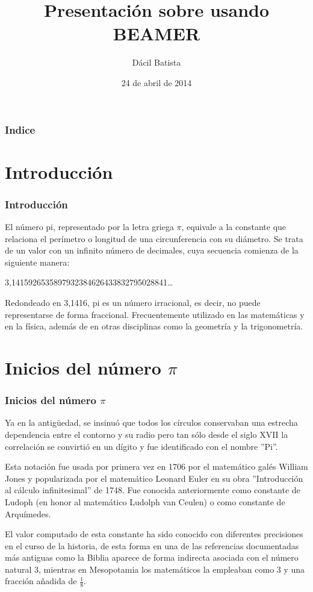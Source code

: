 \documentclass{beamer}
\title[Presentación con Beamer]{Presentación sobre \PI usando BEAMER}
\author[Dácil]{Dácil Batista}
\institute{ULL}
\date[24-04-2014]{24 de abril de 2014}
\newcommand{\PI}{{$\pi$}}
\begin{document}
\begin{frame}
\titlepage
\end{frame}

\begin{frame}
\frametitle{Indice}
\tableofcontents[pausesections]
\end{frame}

\section{Introducción}

\begin{frame}
\frametitle{Introducción}

El número pi, representado por la letra griega \PI, equivale a la constante que relaciona el perímetro o longitud de una circunferencia con su diámetro. Se trata de un valor con un infinito número de decimales, cuya secuencia comienza de la siguiente manera:

\centerline{3,1415926535897932384626433832795028841\dots}

Redondeado en 3,1416, pi es un número irracional, es decir, no puede representarse de forma fraccional. Frecuentemente utilizado en las matemáticas y en la física, además de en otras disciplinas como la geometría y la trigonometría.


\end{frame}

\section{Inicios del número \PI}
\begin{frame}
\frametitle{Inicios del número \PI}

Ya en la antigüedad, se insinuó que todos los círculos conservaban una estrecha dependencia entre el contorno y su radio pero tan sólo desde el siglo XVII la correlación se convirtió en un dígito y fue identificado con el nombre ''Pi''.

Esta notación fue usada por primera vez en 1706 por el matemático galés William Jones y popularizada por el matemático Leonard Euler en su obra ''Introducción al cálculo infinitesimal'' de 1748. Fue conocida anteriormente como constante de Ludoph (en honor al matemático Ludolph van Ceulen) o como constante de Arquímedes.

El valor computado de esta constante ha sido conocido con diferentes precisiones en el curso de la historia, de esta forma en una de las referencias documentadas más antiguas como la Biblia aparece de forma indirecta asociada con el número natural 3, mientras en Mesopotamia los matemáticos la empleaban como 3 y una fracción añadida de $\frac{1}{8}$.

\end {frame}
\end{document}
